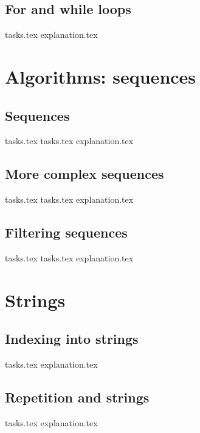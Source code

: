     \section{For and while loops}
    {tasks.tex}         \newpage
    {explanation.tex}      \newpage

    \chapter{Algorithms: sequences}
    \newpage

    \section{Sequences}
    {tasks.tex}            \newpage
    {tasks.tex}         \newpage
    {explanation.tex}      \newpage

    \section{More complex sequences}
    {tasks.tex}        \newpage
    {tasks.tex}     \newpage
    {explanation.tex}  \newpage

    \section{Filtering sequences}
    {tasks.tex}               \newpage
    {tasks.tex}            \newpage
    {explanation.tex}         \newpage

    \chapter{Strings}
    \newpage

    \section{Indexing into strings}
    {tasks.tex}          \newpage
    {explanation.tex}       \newpage

    \section{Repetition and strings}
    {tasks.tex}      \newpage
    {explanation.tex}   \newpage

